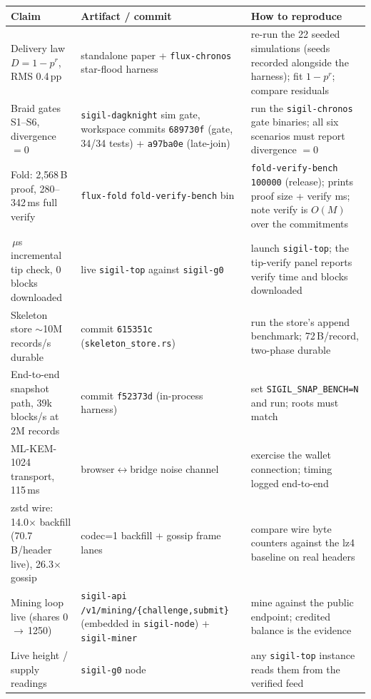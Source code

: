 \documentclass[10pt,a4paper]{article}
\begin{document}
\begin{center}
\small
{}
\renewcommand{\arraystretch}{1.45}
\begin{tabularx}{\textwidth}{@{}>{\RaggedRight\arraybackslash}p{4.4cm}>{\RaggedRight\arraybackslash}p{4.2cm}>{\RaggedRight\arraybackslash}X@{}}
\toprule
Claim & Artifact / commit & How to reproduce \\
\midrule
Delivery law $D=1-p^r$, RMS 0.4\,pp & standalone paper + \texttt{flux-chronos}
star-flood harness & re-run the 22 seeded simulations (seeds recorded alongside the
harness); fit $1-p^r$; compare residuals \\
Braid gates S1--S6, divergence $=0$ & \texttt{sigil-dagknight} sim gate, workspace
commits \texttt{689730f} (gate, 34/34 tests) + \texttt{a97ba0e} (late-join) & run the
\texttt{sigil-chronos} gate binaries; all six scenarios must report divergence $=0$ \\
Fold: 2{,}568\,B proof, 280--342\,ms full verify & \texttt{flux-fold}
\texttt{fold-verify-bench} bin & \texttt{fold-verify-bench 100000} (release);
prints proof size + verify ms; note verify is $O(M)$ over the commitments \\
3\,$\mu$s incremental tip check, 0 blocks downloaded & live \texttt{sigil-top}
against \texttt{sigil-g0} & launch \texttt{sigil-top}; the tip-verify panel reports
verify time and blocks downloaded \\
Skeleton store $\sim$10M records/s durable & commit \texttt{615351c}
(\texttt{skeleton\_store.rs}) & run the store's append benchmark; 72\,B/record,
two-phase durable \\
End-to-end snapshot path, 39k blocks/s at 2M records & commit \texttt{f52373d}
(in-process harness) & set \texttt{SIGIL\_SNAP\_BENCH=N} and run; roots must match \\
ML-KEM-1024 transport, 115\,ms & browser$\leftrightarrow$bridge noise channel &
exercise the wallet connection; timing logged end-to-end \\
zstd wire: 14.0$\times$ backfill (70.7\,B/header live), 26.3$\times$ gossip &
codec=1 backfill + gossip frame lanes & compare wire byte counters against the lz4
baseline on real headers \\
Mining loop live (shares 0\,$\to$\,1250) & \texttt{sigil-api}
\texttt{/v1/mining/\{challenge,submit\}} (embedded in \texttt{sigil-node}) +
\texttt{sigil-miner} & mine against the public endpoint; credited balance is the
evidence \\
Live height / supply readings & \texttt{sigil-g0} node & any \texttt{sigil-top}
instance reads them from the verified feed \\
\bottomrule
\end{tabularx}
\end{center}
\end{document}
